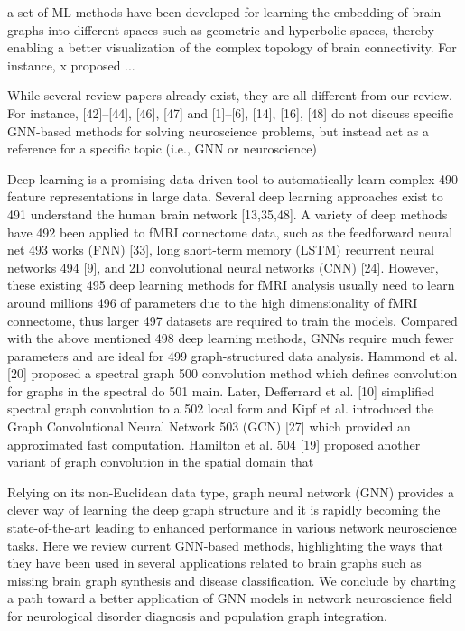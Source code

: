 a set of ML methods have been developed for
learning the embedding of brain graphs into different
spaces such as geometric and hyperbolic spaces, thereby
enabling a better visualization of the complex topology of
brain connectivity. 
For instance, x proposed ...

While several review papers already exist,
they are all different from our review. For instance, [42]–[44],
[46], [47] and [1]–[6], [14], [16], [48] do not discuss specific
GNN-based methods for solving neuroscience problems,
but instead act as a reference for a specific topic (i.e., GNN or
neuroscience)
\cite{Bessadok2022}


Deep learning is a promising data-driven tool to automatically learn complex
490 feature representations in large data. Several deep learning approaches exist to
491 understand the human brain network [13,35,48]. A variety of deep methods have
492 been applied to fMRI connectome data, such as the feedforward neural net
493 works (FNN) [33], long short-term memory (LSTM) recurrent neural networks
494 [9], and 2D convolutional neural networks (CNN) [24]. However, these existing
495 deep learning methods for fMRI analysis usually need to learn around millions
496 of parameters due to the high dimensionality of fMRI connectome, thus larger
497 datasets are required to train the models. Compared with the above mentioned
498 deep learning methods, GNNs require much fewer parameters and are ideal for
499 graph-structured data analysis. Hammond et al. [20] proposed a spectral graph
500 convolution method which defines convolution for graphs in the spectral do
501 main. Later, Defferrard et al. [10] simplified spectral graph convolution to a
502 local form and Kipf et al. introduced the Graph Convolutional Neural Network
503 (GCN) [27] which provided an approximated fast computation. Hamilton et al.
504 [19] proposed another variant of graph convolution in the spatial domain that
\cite{Li2020}

Relying on its non-Euclidean data type, graph neural network (GNN)
provides a clever way of learning the deep graph structure and it is 
rapidly becoming the state-of-the-art leading to enhanced
performance in various network neuroscience tasks. Here we review current 
GNN-based methods, highlighting the ways that they have
been used in several applications related to brain graphs such as missing 
brain graph synthesis and disease classification. We
conclude by charting a path toward a better application of GNN models in 
network neuroscience field for neurological disorder
diagnosis and population graph integration.
\cite{Bessadok2022}


